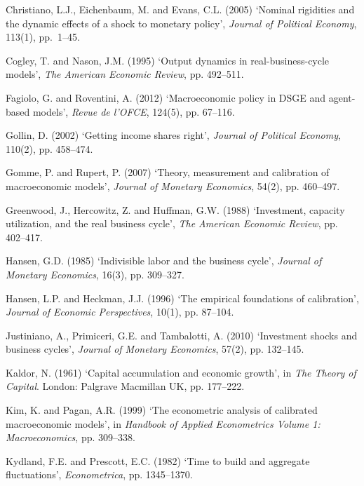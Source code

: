 \documentclass[12pt]{article}
\begin{document}
\begin{thebibliography}{}
Christiano, L.J., Eichenbaum, M. and Evans, C.L. (2005) 
`Nominal rigidities and the dynamic effects of a shock to monetary policy',
\textit{Journal of Political Economy}, 113(1), pp.~1--45.

Cogley, T. and Nason, J.M. (1995) ‘Output dynamics in real-business-cycle models’, \textit{The American Economic Review}, pp. 492–511.

Fagiolo, G. and Roventini, A. (2012) ‘Macroeconomic policy in DSGE and agent-based models’, \textit{Revue de l’OFCE}, 124(5), pp. 67–116.

Gollin, D. (2002) ‘Getting income shares right’, \textit{Journal of Political Economy}, 110(2), pp. 458–474.

Gomme, P. and Rupert, P. (2007) ‘Theory, measurement and calibration of macroeconomic models’, \textit{Journal of Monetary Economics}, 54(2), pp. 460–497.

Greenwood, J., Hercowitz, Z. and Huffman, G.W. (1988) ‘Investment, capacity utilization, and the real business cycle’, \textit{The American Economic Review}, pp. 402–417.

Hansen, G.D. (1985) ‘Indivisible labor and the business cycle’, \textit{Journal of Monetary Economics}, 16(3), pp. 309–327.

Hansen, L.P. and Heckman, J.J. (1996) ‘The empirical foundations of calibration’, \textit{Journal of Economic Perspectives}, 10(1), pp. 87–104.

Justiniano, A., Primiceri, G.E. and Tambalotti, A. (2010) ‘Investment shocks and business cycles’, \textit{Journal of Monetary Economics}, 57(2), pp. 132–145.

Kaldor, N. (1961) ‘Capital accumulation and economic growth’, in \textit{The Theory of Capital}. London: Palgrave Macmillan UK, pp. 177–222.

Kim, K. and Pagan, A.R. (1999) ‘The econometric analysis of calibrated macroeconomic models’, in \textit{Handbook of Applied Econometrics Volume 1: Macroeconomics}, pp. 309–338.

Kydland, F.E. and Prescott, E.C. (1982) ‘Time to build and aggregate fluctuations’, \textit{Econometrica}, pp. 1345–1370.


\end{thebibliography}
\end{document}
